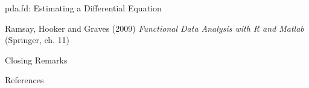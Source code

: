 \documentclass[compress]{beamer}
\begin{document}
\begin{frame}{pda.fd:  Estimating a Differential Equation}

Ramsay, Hooker and Graves (2009)
\emph{Functional Data Analysis with R and Matlab}
(Springer, ch. 11)

\end{frame}
\begin{frame}{Closing Remarks}

\end{frame}

\begin{frame}{References}




\end{frame}
\end{document}
